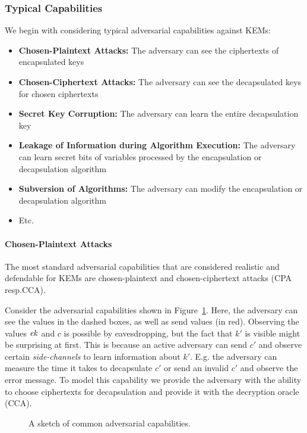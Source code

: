 \subsubsection{Typical Capabilities}
We begin with considering typical adversarial capabilities against KEMs:
\begin{itemize}
    \item \textbf{Chosen-Plaintext Attacks:}
    The adversary can see the ciphertexts of encapsulated keys
    \item \textbf{Chosen-Ciphertext Attacks:}
    The adversary can see the decapsulated keys for chosen ciphertexts
    \item \textbf{Secret Key Corruption:}
    The adversary can learn the entire decapsulation key
    \item \textbf{Leakage of Information during Algorithm Execution:}
    The adversary can learn secret bits of variables processed by the encapsulation or decapsulation algorithm
    \item \textbf{Subversion of Algorithms:}
    The adversary can modify the encapsulation or decapsulation algorithm
    \item Etc.
\end{itemize}

\paragraph{Chosen-Plaintext Attacks}
The most standard adversarial capabilities that are considered realistic and defendable for KEMs are chosen-plaintext and chosen-ciphertext attacks (CPA resp.\@ CCA).

Consider the adversarial capabilities shown in Figure~\ref{fig:adv_capabilities}.
Here, the adversary can see the values in the dashed boxes, as well as send values (in red).
Observing the values $\mathit{ek}$ and $c$ is possible by eavesdropping, but the fact that $k'$ is visible might be surprising at first.
This is because an active adversary can send $c'$ and observe certain \emph{side-channels} to learn information about $k'$.
E.g. the adversary can measure the time it takes to decapsulate $c'$ or send an invalid $c'$ and observe the error message.
To model this capability we provide the adversary with the ability to choose ciphertexts for decapsulation and provide it with the decryption oracle (CCA).

\begin{figure}[!ht]
    \centering
    \caption{%
        A sketch of common adversarial capabilities.
    }
    \label{fig:adv_capabilities}
\end{figure}

